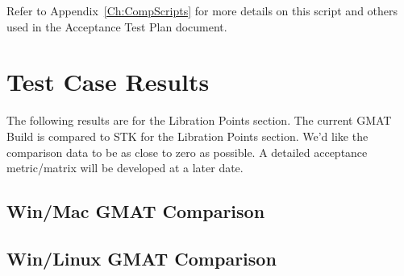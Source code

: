 Refer to Appendix~\ref{Ch:CompScripts} for more details on this
script and others used in the Acceptance Test Plan document.

\section{Test Case Results}
The following results are for the Libration Points section. The
current GMAT Build is compared to STK for the Libration
Points section. We'd like the comparison data to be as close to zero
as possible. A detailed acceptance metric/matrix will be developed
at a later date.




\subsection{Win/Mac GMAT Comparison}



\clearpage
\subsection{Win/Linux GMAT Comparison}


